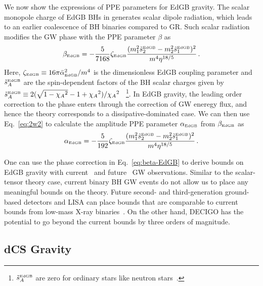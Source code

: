 \documentclass[prd,twocolumn,nofootinbib]{revtex4-1}
\newcommand{\EDGB}{{\mbox{\tiny EdGB}}}
\begin{document}
We now show the expressions of PPE parameters for EdGB gravity. The scalar monopole charge of EdGB BHs in  generates scalar dipole radiation, which leads to an earlier coalescence of BH binaries compared to GR. Such scalar radiation modifies the GW phase with the PPE parameter $\beta$ as~\cite{Yunes:2016jcc,Yagi:2011xp}
\begin{equation}
\label{eq:beta-EdGB}
 \beta_\EDGB=-\frac{5}{7168}\zeta_\EDGB\frac{(m_1^2\tilde s_2^\EDGB-m_2^2\tilde s_1^\EDGB)^2}{m^4\eta^{18/5}}\,.
 \end{equation}
 Here, $\zeta_\EDGB\equiv 16 \pi \bar{\alpha}_\EDGB^2/m^4$ is the dimensionless EdGB coupling parameter and $\tilde s_{A}^\EDGB$ are the spin-dependent factors of the BH scalar charges given by $\tilde s_{A}^\EDGB\equiv 2(\sqrt{1-{\chi_A}^2}-1+{\chi_A}^2)/{\chi_A}^2~$~\cite{Berti:2018cxi,Prabhu:2018aun}\footnote{$\tilde s_A^\EDGB$ are zero for ordinary stars like neutron stars~\cite{Yagi:2011xp,Yagi:2015oca}.}. In EdGB gravity, the leading order correction to the phase enters through the correction of GW eneregy flux, and hence the theory corresponds to a dissipative-dominated case. We can then use Eq.~\eqref{eq:2w2} to calculate the amplitude PPE parameter $\alpha_\EDGB$ from $\beta_\EDGB$ as  
 \begin{equation}
 \alpha_\EDGB=-\frac{5}{192}\zeta_\EDGB\frac{(m_1^2 \tilde s_2^\EDGB-m_2^2 \tilde s_1^\EDGB)^2}{m^4\eta^{18/5}}\,.
 \end{equation}
 
 One can use the phase correction in Eq.~\eqref{eq:beta-EdGB} to derive bounds on EdGB gravity with current~\cite{Yunes:2016jcc} and future~\cite{Yagi:2012gp} GW observations. Similar to the scalar-tensor theory case, current binary BH GW events do not allow us to place any meaningful bounds on the theory. Future second- and third-generation ground-based detectors and LISA can place bounds that are comparable to current bounds from low-mass X-ray binaries~\cite{Yagi:2012gp}. On the other hand, DECIGO has the potential to go beyond the current bounds by three orders of magnitude.
 
  \subsection{dCS Gravity}
  
\end{document}
